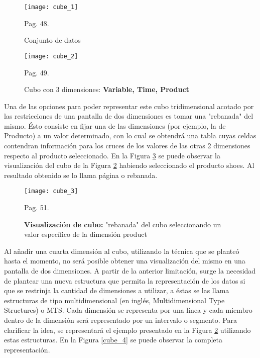 \documentclass[a4paper,11pt]{article}
\begin{document}
    \begin{figure}
      \begin{center}
        \texttt{[image: cube\_1]}
        \caption{Conjunto de datos} \cite{olap_solutions} Pag. 48.
        \label{tab_cube}
      \end{center}
    \end{figure}
    
    \begin{figure}
      \begin{center}
        \texttt{[image: cube\_2]}
        \caption{Cubo con 3 dimensiones: \textbf{Variable, Time, Product}} \cite{olap_solutions} Pag. 49.
        \label{cube_2}
      \end{center}
    \end{figure}
    
    
    Una de las opciones para poder representar este cubo tridimensional acotado por las restricciones de una pantalla de dos dimensiones es tomar una
    "rebanada" del mismo. Ésto consiste en fijar una de las dimensiones (por ejemplo, la de Producto) a un valor determinado, con lo cual se obtendrá una
    tabla cuyas celdas contendran información para los cruces de los valores de las otras 2 dimensiones respecto al producto seleccionado. En la Figura
    \ref{cube_3} se puede observar la visualización del cubo de la Figura \ref{cube_2} habiendo seleccionado el producto shoes. Al resultado obtenido se
    lo llama página o rebanada.\par 
    
    \begin{figure}
      \begin{center}
        \texttt{[image: cube\_3]}
        \caption{\textbf{Visualización de cubo:} "rebanada" del cubo seleccionando un valor específico de la dimensión product} \cite{olap_solutions} Pag. 51.
        \label{cube_3}
      \end{center}
    \end{figure}
    
    
    Al añadir una cuarta dimensión al cubo, utilizando la técnica que se planteó hasta el momento, no será posible obtener una visualización del mismo en una
    pantalla de dos dimensiones. A partir de la anterior limitación, surge la necesidad de plantear una nueva estructura que permita la representación de los
    datos si que se restrinja la cantidad de dimensiones a utilizar, a éstas se las llama estructuras de tipo multidimensional (en inglés, Multidimensional Type
    Structures) o MTS. Cada dimensión se representa por una línea y cada miembro dentro de la dimensión será representado por un intervalo o segmento. Para
    clarificar la idea, se representará el ejemplo presentado en la Figura \ref{cube_2} utilizando estas estructuras. En la Figura \ref{cube_4} se puede observar
    la completa representación.
    
\end{document}
